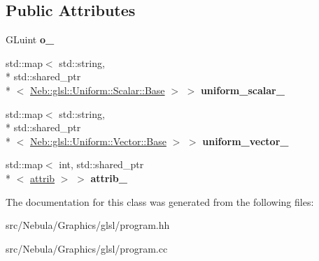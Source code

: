 \subsection*{Public Attributes}
\begin{DoxyCompactItemize}
\item 
\hypertarget{classNeb_1_1glsl_1_1program_ae5eb6255fdb52393d6ba5ef6154a6004}{G\-Luint {\bfseries o\-\_\-}}\label{classNeb_1_1glsl_1_1program_ae5eb6255fdb52393d6ba5ef6154a6004}

\item 
\hypertarget{classNeb_1_1glsl_1_1program_a96ae6982bdd2fe9b7609e4e8a5009733}{std\-::map$<$ std\-::string, \\*
std\-::shared\-\_\-ptr\\*
$<$ \hyperlink{classNeb_1_1glsl_1_1Uniform_1_1Scalar_1_1Base}{Neb\-::glsl\-::\-Uniform\-::\-Scalar\-::\-Base} $>$ $>$ {\bfseries uniform\-\_\-scalar\-\_\-}}\label{classNeb_1_1glsl_1_1program_a96ae6982bdd2fe9b7609e4e8a5009733}

\item 
\hypertarget{classNeb_1_1glsl_1_1program_aaa98c3730eaf9b9f02b7b9d056acb7c3}{std\-::map$<$ std\-::string, \\*
std\-::shared\-\_\-ptr\\*
$<$ \hyperlink{classNeb_1_1glsl_1_1Uniform_1_1Vector_1_1Base}{Neb\-::glsl\-::\-Uniform\-::\-Vector\-::\-Base} $>$ $>$ {\bfseries uniform\-\_\-vector\-\_\-}}\label{classNeb_1_1glsl_1_1program_aaa98c3730eaf9b9f02b7b9d056acb7c3}

\item 
\hypertarget{classNeb_1_1glsl_1_1program_ae5f072f077cff9edbac00de231068383}{std\-::map$<$ int, std\-::shared\-\_\-ptr\\*
$<$ \hyperlink{classNeb_1_1glsl_1_1attrib}{attrib} $>$ $>$ {\bfseries attrib\-\_\-}}\label{classNeb_1_1glsl_1_1program_ae5f072f077cff9edbac00de231068383}

\end{DoxyCompactItemize}


The documentation for this class was generated from the following files\-:\begin{DoxyCompactItemize}
\item 
src/\-Nebula/\-Graphics/glsl/program.\-hh\item 
src/\-Nebula/\-Graphics/glsl/program.\-cc\end{DoxyCompactItemize}
